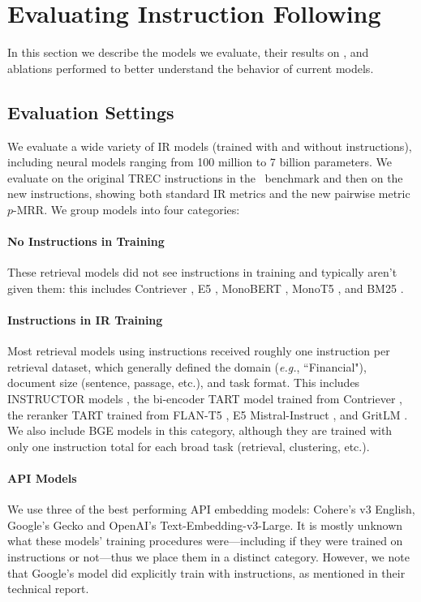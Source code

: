 \documentclass{article} %
\newcommand{\metricrank}{$p$-MRR}
\begin{document}
\section{Evaluating Instruction Following}
In this section we describe the models we evaluate, their results on \dataset, and ablations performed to better understand the behavior of current models. 

\subsection{Evaluation Settings}
We evaluate a wide variety of IR models (trained with and without instructions), including neural models ranging from 100 million to 7 billion parameters. We evaluate on the original TREC instructions in the \dataset\ benchmark and then on the new instructions, showing both standard IR metrics and the new pairwise metric \metricrank. We group models into four categories:

\paragraph{No Instructions in Training} These  retrieval models did not see instructions in training and typically aren't given them: this includes Contriever \citep{izacard2021unsupervised}, E5 \citep{wang2022text}, MonoBERT \cite{nogueira2019multi}, MonoT5 \citep{nogueira2020document}, and BM25 \citep{robertson1995okapi}. 



\paragraph{Instructions in IR Training} Most retrieval models using instructions received roughly one instruction per retrieval dataset, which generally defined the domain (\textit{e.g.}, ``Financial"), document size (sentence, passage, etc.), and task format. This includes INSTRUCTOR models \citep{INSTRUCTOR}, the bi-encoder TART model trained from Contriever \citep{asai2022tart}, the reranker TART trained from FLAN-T5 \citep{chung2022scaling}, E5 Mistral-Instruct \citep{wang2023improving}, and GritLM \citep{muennighoff2024generative}.  We also include BGE models \citep{bge_embedding} in this category, although they are trained with only one instruction total for each broad task (retrieval, clustering, etc.). 

\paragraph{API Models} We use three of the best performing API embedding models: Cohere's v3 English, Google's Gecko \citep{lee2024gecko} and OpenAI's Text-Embedding-v3-Large. It is mostly unknown what these models' training procedures were---including if they were trained on instructions or not---thus we place them in a distinct category. However, we note that Google's model did explicitly train with instructions, as mentioned in their technical report. 
\end{document}
